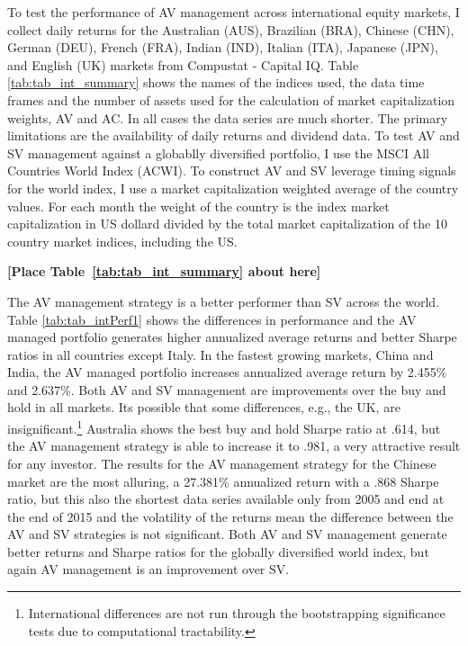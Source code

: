 
To test the performance of AV management across international equity markets, I collect daily returns for the Australian (AUS), Brazilian (BRA), Chinese (CHN), German (DEU), French (FRA), Indian (IND), Italian (ITA), Japanese (JPN), and English (UK) markets from Compustat - Capital IQ. Table \ref{tab:tab_int_summary} shows the names of the indices used, the data time frames and the number of assets used for the calculation of market capitalization weights, AV and AC. In all cases the data series are much shorter. The primary limitations are the availability of daily returns and dividend data. To test AV and SV management against a globablly diversified portfolio, I use the MSCI All Countries World Index (ACWI). To construct AV and SV leverage timing signals for the world index, I use a market capitalization weighted average of the country values. For each month the weight of the country is the index market capitalization in US dollard divided by the total market capitalization of the 10 country market indices, including the US.

\bigskip
\centerline{\bf [Place Table~\ref{tab:tab_int_summary} about here]}
\bigskip

The AV management strategy is a better performer than SV across the world. Table \ref{tab:tab_intPerf1} shows the differences in performance and the AV managed portfolio generates higher annualized average returns and better Sharpe ratios in all countries except Italy. In the fastest growing markets, China and India, the AV managed portfolio increases annualized average return by 2.455\% and 2.637\%. Both AV and SV management are improvements over the buy and hold in all markets. Its possible that some differences, e.g., the UK, are insignificant.\footnote{International differences are not run through the bootstrapping significance tests due to computational tractability.} 
Australia shows the best buy and hold Sharpe ratio at .614, but the AV management strategy is able to increase it to .981, a very attractive result for any investor. The results for the AV management strategy for the Chinese market are the most alluring, a 27.381\% annualized return with a .868 Sharpe ratio, but this also the shortest data series available only from 2005 and end at the end of 2015 and the volatility of the returns mean the difference between the AV and SV strategies is not significant. Both AV and SV management generate better returns and Sharpe ratios for the globally diversified world index, but again AV management is an improvement over SV.

